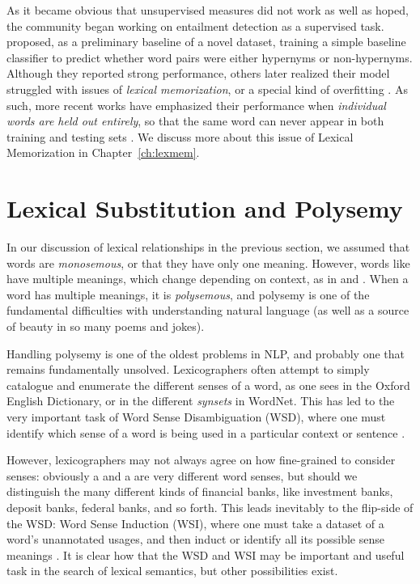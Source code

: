 As it became obvious that unsupervised measures did not work as
well as hoped, the community began working on entailment detection as a
supervised task.  proposed, as a preliminary baseline
of a novel dataset, training a simple baseline classifier to predict whether
word pairs were either hypernyms or non-hypernyms. Although they reported strong performance,
others later realized their model struggled with issues of {\em lexical
memorization}, or a special kind of overfitting
\cite{roller:2014:coling,weeds:2014:coling,levy:2015:naacl}. As such, more
recent works have emphasized their performance when {\em individual words are
held out entirely}, so that the same word can never appear in both training and
testing sets
\cite{roller:2014:coling,kruszewski:2015:tacl,levy:2015:naacl,shwartz:2016:acl,roller:2016:naacl}.
We discuss more about this issue of Lexical Memorization in
Chapter~\ref{ch:lexmem}.

\section{Lexical Substitution and Polysemy}
\label{sec:lexsub}

In our discussion of lexical relationships in the previous section, we assumed
that words are {\em monosemous}, or that they have only one meaning. However,
words like  have multiple meanings, which change depending on
context, as in  and . When a word has
multiple meanings, it is {\em polysemous}, and polysemy is one of the
fundamental difficulties with understanding natural language (as well as a
source of beauty in so many poems and jokes).

Handling polysemy is one of the oldest problems in NLP, and probably one that
remains fundamentally unsolved. Lexicographers often attempt to simply
catalogue and enumerate the different senses of a word, as one sees in the
Oxford English Dictionary, or in the different {\em synsets} in WordNet.
This has led to the very important task of Word Sense Disambiguation (WSD),
where one must identify which sense of a word is being used in a particular
context or sentence \cite{needcite}.

However, lexicographers may not always agree on how fine-grained to consider
senses: obviously a  and a  are very
different word senses, but should we distinguish the many different kinds of
financial banks, like investment banks, deposit banks, federal banks, and so
forth. This leads inevitably to the flip-side of the WSD: Word Sense Induction
(WSI), where one must take a dataset of a word's unannotated usages, and then
induct or identify all its possible sense meanings \cite{needcite,qiu:2016:emnlp}. It is clear
how that the WSD and WSI may be important and useful task in the search of
lexical semantics, but other possibilities exist.

